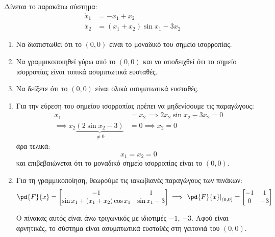 \documentclass[11pt,a4paper,notitlepage,fleqn]{article}
\begin{document}
\begin{exercise}
	Δίνεται το παρακάτω σύστημα:
	\begin{align*}
        \dot x_1 &= -x_1 + x_2\\
        \dot x_2 &= (x_1+x_2)\sin x_1 - 3x_2
	\end{align*}

	\begin{enumerate}
		\item Να διαπιστωθεί ότι το \( (0,0) \) είναι το μοναδικό του σημείο ισορροπίας.
		\item Να γραμμικοποιηθεί γύρω από το \( (0,0) \) και να αποδειχθεί
		ότι το σημείο ισορροπίας είναι τοπικά ασυμπτωτικά ευσταθές.
		\item Να δείξετε ότι το \( (0,0) \) είναι ολικά ασυμπτωτικά ευσταθές.
	\end{enumerate}
\tcblower

    \begin{enumerate}
    	\item Για την εύρεση του σημείου ισορροπίας πρέπει να μηδενίσουμε
    	τις παραγώγους:
    	\begin{align*}
    		x_1 &= x_2 \implies 2x_2\sin x_2 - 3x_2 = 0\\
    		\implies x_2\underbrace{(2\sin x_2 - 3)}_{\neq 0} & = 0
    		\implies x_2 = 0
    	\end{align*}
    	άρα τελικά:
    	\[
    	x_1 = x_2 = 0
    	\]
    	και επιβεβαιώνεται ότι το μοναδικό σημείο ισορροπίας είναι το
    	\( (0,0) \).

    	\item Για τη γραμμικοποίηση, θεωρούμε τις ιακωβιανές παραγώγους των πινάκων:
    	\begin{align*}
    		\pd{F}{x} = \left[\begin{matrix}
    		-1 & 1 \\ \sin x_1 + (x_1+x_2)\cos x_1 & \sin x_1 - 3
    		\end{matrix}\right]
    		\implies \left.\pd{F}{x} \right|_{(0,0)} = \left[\begin{matrix}
    		-1 & 1 \\ 0 & -3
    		\end{matrix}\right]
    	\end{align*}

    	Ο πίνακας αυτός είναι άνω τριγωνικός με ιδιοτιμές \( -1 \), \( -3 \). Αφού είναι αρνητικές, το σύστημα είναι ασυμπτωτικά ευσταθές στη γειτονιά του \( (0,0) \).


\end{enumerate}
\end{exercise}
\end{document}

